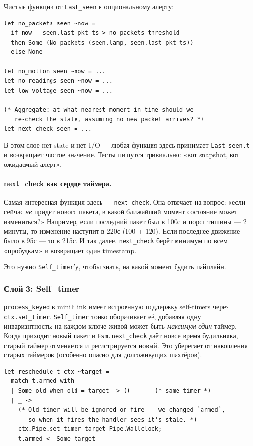 Чистые функции от \texttt{Last\_seen} к опциональному алерту:

\begin{lstlisting}
let no_packets seen ~now =
  if now - seen.last_pkt_ts > no_packets_threshold
  then Some (No_packets (seen.lamp, seen.last_pkt_ts))
  else None

let no_motion seen ~now = ...
let no_readings seen ~now = ...
let low_voltage seen ~now = ...

(* Aggregate: at what nearest moment in time should we
   re-check the state, assuming no new packet arrives? *)
let next_check seen = ...
\end{lstlisting}

В этом слое нет state и нет I/O --- любая функция здесь принимает
\texttt{Last\_seen.t} и возвращает чистое значение. Тесты пишутся
тривиально: «вот snapshot, вот ожидаемый алерт».

\paragraph{next\_check как сердце таймера.} Самая интересная функция
здесь --- \texttt{next\_check}. Она отвечает на вопрос: «если сейчас
\emph{не} придёт нового пакета, в какой ближайший момент состояние
может измениться?» Например, если последний пакет был в 100с и
порог тишины --- 2 минуты, то изменение наступит в 220с
(100 + 120). Если последнее движение было в 95с --- то в 215с. И
так далее. \texttt{next\_check} берёт минимум по всем «пробудкам»
и возвращает один timestamp.

Это нужно \texttt{Self\_timer}'у, чтобы знать, на какой момент
будить пайплайн.

\subsubsection{Слой 3: Self\_timer}

\texttt{process\_keyed} в miniFlink имеет встроенную поддержку
self-timers через \texttt{ctx.set\_timer}. \texttt{Self\_timer}
тонко оборачивает её, добавляя одну инвариантность: на каждом ключе
живой может быть \emph{максимум один} таймер. Когда приходит новый
пакет и \texttt{Fsm.next\_check} даёт новое время будильника, старый
таймер отменяется и регистрируется новый. Это уберегает от
накопления старых таймеров (особенно опасно для долгоживущих
шахтёров).

\begin{lstlisting}
let reschedule t ctx ~target =
  match t.armed with
  | Some old when old = target -> ()       (* same timer *)
  | _ ->
    (* Old timer will be ignored on fire -- we changed `armed`,
       so when it fires the handler sees it's stale. *)
    ctx.Pipe.set_timer target Pipe.Wallclock;
    t.armed <- Some target
\end{lstlisting}

